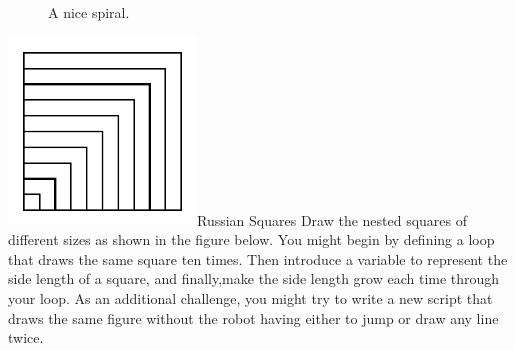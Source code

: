 \documentclass[a4paper,10pt,twoside]{book}
\begin{document}
\begin{figure}[h]
\caption{A nice spiral.\label{fig:nicespiral}}
\end{figure}


\begin{exofigwithsizeandtitle}[0.6]{\includegraphics[width=5cm]{Argmirescr}}{Russian Squares}
Draw the nested squares of different sizes as shown in the figure below. You might begin by defining a loop that draws the same square ten times. Then introduce a variable  to represent the side length of a square, and finally,make the side length grow each time through your loop. As an additional challenge, you might try to write a new script that draws the same figure without the robot having either to jump or draw any line twice.	
\end{exofigwithsizeandtitle}
\end{document}
